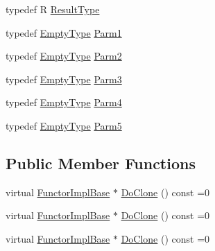 \begin{DoxyCompactItemize}
\item 
typedef R \mbox{\hyperlink{structUtil_1_1Private_1_1FunctorImplBase_a5e95fd30fdd89f3c5080b68ab5891bc3}{Result\+Type}}
\item 
typedef \mbox{\hyperlink{classUtil_1_1EmptyType}{Empty\+Type}} \mbox{\hyperlink{structUtil_1_1Private_1_1FunctorImplBase_a9d61e693d6c616dea5bd9d9073c7d21a}{Parm1}}
\item 
typedef \mbox{\hyperlink{classUtil_1_1EmptyType}{Empty\+Type}} \mbox{\hyperlink{structUtil_1_1Private_1_1FunctorImplBase_a554085cd798ef14838a59b528f0feb2e}{Parm2}}
\item 
typedef \mbox{\hyperlink{classUtil_1_1EmptyType}{Empty\+Type}} \mbox{\hyperlink{structUtil_1_1Private_1_1FunctorImplBase_a052148e627fd4caecbcffdbdf1033dbb}{Parm3}}
\item 
typedef \mbox{\hyperlink{classUtil_1_1EmptyType}{Empty\+Type}} \mbox{\hyperlink{structUtil_1_1Private_1_1FunctorImplBase_a1ad7fe3f243480c44a610927ebe76762}{Parm4}}
\item 
typedef \mbox{\hyperlink{classUtil_1_1EmptyType}{Empty\+Type}} \mbox{\hyperlink{structUtil_1_1Private_1_1FunctorImplBase_ac5b1d132e854e4f9fd6fb1e43313fa26}{Parm5}}
\end{DoxyCompactItemize}
\subsection*{Public Member Functions}
\begin{DoxyCompactItemize}
\item 
virtual \mbox{\hyperlink{structUtil_1_1Private_1_1FunctorImplBase}{Functor\+Impl\+Base}} $\ast$ \mbox{\hyperlink{structUtil_1_1Private_1_1FunctorImplBase_a3e0e91d434c55173ed546839b53721c5}{Do\+Clone}} () const =0
\item 
virtual \mbox{\hyperlink{structUtil_1_1Private_1_1FunctorImplBase}{Functor\+Impl\+Base}} $\ast$ \mbox{\hyperlink{structUtil_1_1Private_1_1FunctorImplBase_a3e0e91d434c55173ed546839b53721c5}{Do\+Clone}} () const =0
\item 
virtual \mbox{\hyperlink{structUtil_1_1Private_1_1FunctorImplBase}{Functor\+Impl\+Base}} $\ast$ \mbox{\hyperlink{structUtil_1_1Private_1_1FunctorImplBase_a3e0e91d434c55173ed546839b53721c5}{Do\+Clone}} () const =0
\end{DoxyCompactItemize}

